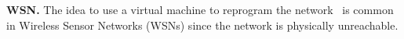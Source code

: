 
\textbf{WSN.} The idea to use a virtual machine to reprogram the network~\cite{Paek:2010:TAT:1777406.1777413,Levis:2002:MTV:635508.605407}
 is common in Wireless Sensor Networks (WSNs) since the network is physically unreachable.


